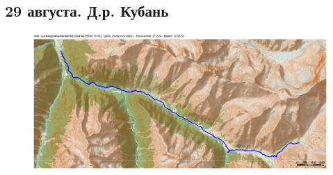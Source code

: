 \subsection{29 августа. Д.р. Кубань}

\begin{figure}[h!]
	\centering
	\includegraphics[angle=0, width=0.3\linewidth]{../pics/mini_maps/29}
	\label{fig:mini_29}
\end{figure}

\newpage